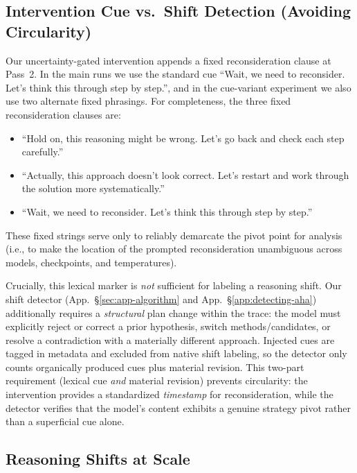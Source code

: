 \subsection{Intervention Cue vs.\ Shift Detection (Avoiding Circularity)}
\label{app:intervention-vs-detector}

Our uncertainty-gated intervention appends a fixed reconsideration clause at Pass~2. In the main runs we use the standard cue ``Wait, we need to reconsider. Let's think this through step by step.'', and in the cue-variant experiment we also use two alternate fixed phrasings. For completeness, the three fixed reconsideration clauses are:
\begin{itemize}[leftmargin=*]
    \item ``Hold on, this reasoning might be wrong. Let's go back and check each step carefully.''
    \item ``Actually, this approach doesn't look correct. Let's restart and work through the solution more systematically.''
    \item ``Wait, we need to reconsider. Let's think this through step by step.''
\end{itemize}
These fixed strings serve only to reliably demarcate the pivot point for analysis (i.e., to make the location of the prompted reconsideration unambiguous across models, checkpoints, and temperatures).

Crucially, this lexical marker is \emph{not} sufficient for labeling a reasoning shift. Our shift detector (App.~\S\ref{sec:app-algorithm} and App.~\S\ref{app:detecting-aha}) additionally requires a \emph{structural} plan change within the  trace: the model must explicitly reject or correct a prior hypothesis, switch methods/candidates, or resolve a contradiction with a materially different approach. Injected cues are tagged in metadata and excluded from native shift labeling, so the detector only counts organically produced cues plus material revision. This two-part requirement (lexical cue \emph{and} material revision) prevents circularity: the intervention provides a standardized \emph{timestamp} for reconsideration, while the detector verifies that the model's content exhibits a genuine strategy pivot rather than a superficial cue alone.

\subsection{Reasoning Shifts at Scale}
\label{app:external-models}

